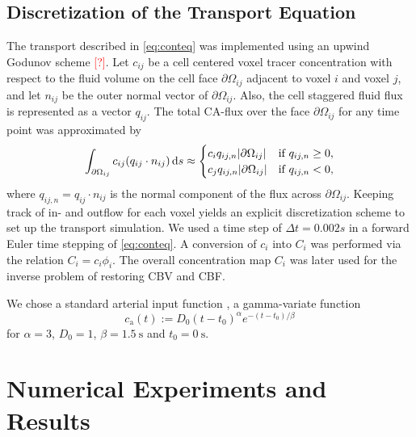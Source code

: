 \documentclass[paper=a4, fontsize=11pt,parskip=half,headings=small]{scrartcl}
\newcommand{\ca}{c_\mathrm{a}}
\newcommand{\missingsource}{\textcolor{red}{[?]}}
\begin{document}
	\subsection{Discretization of the Transport Equation} \label{sec:numtrans}
	The transport described in \eqref{eq:conteq} was implemented using an upwind Godunov scheme \missingsource.
	Let $c_{ij}$ be a cell centered voxel tracer concentration with respect to the fluid volume on the cell face $\partial \Omega_{ij}$ adjacent to voxel $i$ and voxel $j$, and let $n_{ij}$ be the outer normal vector of $\partial \Omega_{ij}$. Also, the cell staggered fluid flux is represented as a vector $q_{ij}$.
	The total CA-flux over the face $\partial \Omega_{ij}$ for any time point was approximated by
	\begin{equation}
	\int_{\partial \Omega_{ij}} c_{ij} (q_{ij}\cdot n_{ij}) \,\mathrm{d} s \approx
	\begin{cases}
	c_i q_{ij,n} \vert \partial \Omega_{ij} \vert & \text{if } q_{ij,n} \geq 0,\\
	c_j q_{ij,n} \vert \partial \Omega_{ij} \vert & \text{if } q_{ij,n} < 0,
	\end{cases}
	\end{equation}
	where $q_{ij,n} = q_{ij} \cdot n_{ij}$ is the normal component of the flux across $\partial \Omega_{ij}$.
	Keeping track of in- and outflow for each voxel yields an explicit discretization scheme to set up the transport simulation. We used a time step of $\Delta t = 0.002 s$ in a forward Euler time stepping of \eqref{eq:conteq}.
	A conversion of $c_i$ into $C_i$ was performed via the relation $C_i = c_i\phi_i$. The overall concentration map $C_i$ was later used for the inverse problem of restoring CBV and CBF.

	We chose a standard arterial input function \cite{ostergaard96}, a gamma-variate \cite{chan04} function
	\begin{equation}
		\ca(t) := D_0(t-t_0)^\alpha e^{-(t-t_0)/\beta}
	\end{equation}
	for $\alpha=3$, $D_0 = 1$, $\beta = \SI{1.5}{\second}$ and $t_0 = \SI{0}{\second}$.






	\section{Numerical Experiments and Results}\label{sec:NumExp}
\end{document}
